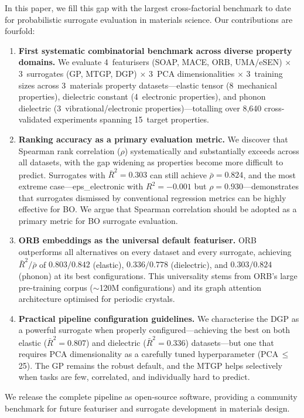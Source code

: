 In this paper, we fill this gap with the largest cross-factorial benchmark to date for probabilistic surrogate evaluation in materials science.
Our contributions are fourfold:
\begin{enumerate}[nosep]
    \item \textbf{First systematic combinatorial benchmark across diverse property domains.}
    We evaluate 4~featurisers (SOAP, MACE, ORB, UMA/eSEN) $\times$ 3~surrogates (GP, MTGP, DGP) $\times$ 3~PCA dimensionalities $\times$ 3~training sizes across 3~materials property datasets---elastic tensor (8~mechanical properties), dielectric constant (4~electronic properties), and phonon dielectric (3~vibrational/electronic properties)---totalling over 8{,}640 cross-validated experiments spanning 15~target properties.
    \item \textbf{Ranking accuracy as a primary evaluation metric.}
    We discover that Spearman rank correlation ($\rho$) systematically and substantially exceeds \Rtwo{} across all datasets, with the gap widening as properties become more difficult to predict.
    Surrogates with $\bar{R}^2 = 0.303$ can still achieve $\bar{\rho} = 0.824$, and the most extreme case---eps\_electronic with $R^2 = -0.001$ but $\rho = 0.930$---demonstrates that surrogates dismissed by conventional regression metrics can be highly effective for BO.
    We argue that Spearman correlation should be adopted as a primary metric for BO surrogate evaluation.
    \item \textbf{ORB embeddings as the universal default featuriser.}
    ORB outperforms all alternatives on every dataset and every surrogate, achieving $\bar{R}^2 / \bar{\rho}$ of $0.803 / 0.842$ (elastic), $0.336 / 0.778$ (dielectric), and $0.303 / 0.824$ (phonon) at its best configurations.
    This universality stems from ORB's large pre-training corpus ($\sim$120M configurations) and its graph attention architecture optimised for periodic crystals.
    \item \textbf{Practical pipeline configuration guidelines.}
    We characterise the DGP as a powerful surrogate when properly configured---achieving the best \Rtwo{} on both elastic ($\bar{R}^2 = 0.807$) and dielectric ($\bar{R}^2 = 0.336$) datasets---but one that requires PCA dimensionality as a carefully tuned hyperparameter (PCA\,$\leq$\,25).
    The GP remains the robust default, and the MTGP helps selectively when tasks are few, correlated, and individually hard to predict.
\end{enumerate}

We release the complete pipeline as open-source software, providing a community benchmark for future featuriser and surrogate development in materials design.
